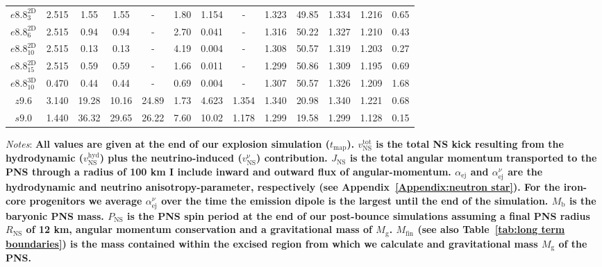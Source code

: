 \documentclass[fleqn,usenatbib]{mnras}
\newcommand{\COM}[1]{{\color{orange}#1}}
\begin{document}
\begin{table}
\begin{tabular}{cccccccccc||ccc}
    \hline
    $e8.8_{3}^{\mathrm{2D}}$ & 2.515 & 1.55  & 1.55  & -     & 1.80  & 1.154 &  -     & 1.323 &  49.85 &  1.334 &  1.216 &  0.65 \\
    $e8.8_{6}^{\mathrm{2D}}$ & 2.515 & 0.94  & 0.94  & -     & 2.70  & 0.041 &  -     & 1.316 &  50.22 &  1.327 &  1.210 &  0.43 \\
    $e8.8_{10}^{\mathrm{2D}}$& 2.515 & 0.13  & 0.13  & -     & 4.19  & 0.004 &  -     & 1.308 &  50.57 &  1.319 &  1.203 &  0.27 \\
    $e8.8_{15}^{\mathrm{2D}}$& 2.515 & 0.59  & 0.59  & -     & 1.66  & 0.011 &  -     & 1.299 &  50.86 &  1.309 &  1.195 &  0.69 \\
    $e8.8_{10}^{\mathrm{3D}}$& 0.470 & 0.44  & 0.44  & -     & 0.69  & 0.004 &  -     & 1.307 &  50.57 &  1.326 &  1.209 &  1.68  \\
    $z9.6$                   & 3.140 & 19.28 & 10.16 & 24.89 & 1.73  & 4.623 & 1.354  & 1.340 &  20.98 &  1.340 &  1.221 &  0.68 \\
    $s9.0$                   & 1.440 & 36.32 & 29.65 & 26.22 & 7.60  & 10.02 & 1.178  & 1.299 &  19.58 &  1.299 &  1.128 &  0.15  \\
    \hline
\end{tabular}
\flushleft
\textit{Notes}: \textbf{All values are given at the end of our explosion simulation ($t_{\mathrm{map}}$). $v_{\mathrm{NS}}^{\mathrm{tot}}$ is the total NS kick resulting from the hydrodynamic ($v_{\mathrm{NS}}^{\mathrm{hyd}}$) plus the neutrino-induced ($v_{\mathrm{NS}}^{\mathrm{\nu}}$) contribution. $J_{\mathrm{NS}}$ is the total angular momentum transported to the PNS through a radius of 100 km \COM{I include inward and outward flux of angular-momentum}. $\alpha_{\mathrm{ej}}$ and $\alpha_{\mathrm{ej}}^{\nu}$ are the hydrodynamic and neutrino anisotropy-parameter, respectively (see Appendix~\ref{Appendix:neutron star}). For the iron-core progenitors we average $\alpha_{\mathrm{ej}}^{\nu}$ over the time the emission dipole is the largest until the end of the simulation. $M_{\mathrm{b}}$ is the baryonic PNS mass. $P_{\mathrm{NS}}$ is the PNS spin period at the end of our post-bounce simulations assuming a final PNS radius $R_{\mathrm{NS}}$ of 12 km, angular momentum conservation and a gravitational mass of $M_{\mathrm{g}}$. $M_{\mathrm{fin}}$ (see also Table~\ref{tab:long term boundaries}) is the mass contained within the excised region from which we calculate and gravitational mass $M_{\mathrm{g}}$ of the PNS. }
\end{table}
\end{document}
